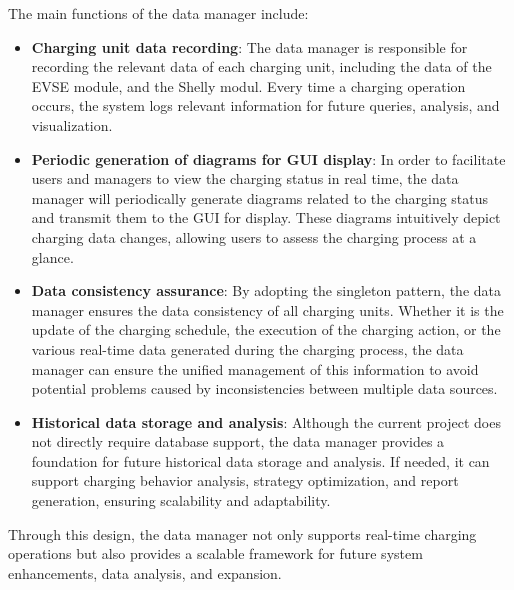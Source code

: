 \documentclass[
english,
ruledheaders=section,%
class=report,%
thesis={type=Report},%
accentcolor=9c,%
custommargins=true,%
marginpar=false,%
parskip=half-,%
fontsize=11pt,%
logofile={img/tuda_logo.pdf}, %
]{tudapub}
\begin{document}
    The main functions of the data manager include:
    \begin{itemize}
        \item \textbf{Charging unit data recording}: The data manager is responsible for recording the relevant data of each charging unit, including the data of the EVSE module, and the Shelly modul. Every time a charging operation occurs, the system logs relevant information for future queries, analysis, and visualization.
        \item \textbf{Periodic generation of diagrams for GUI display}: In order to facilitate users and managers to view the charging status in real time, the data manager will periodically generate diagrams related to the charging status and transmit them to the GUI for display. These diagrams intuitively depict charging data changes, allowing users to assess the charging process at a glance.
        \item \textbf{Data consistency assurance}: By adopting the singleton pattern, the data manager ensures the data consistency of all charging units. Whether it is the update of the charging schedule, the execution of the charging action, or the various real-time data generated during the charging process, the data manager can ensure the unified management of this information to avoid potential problems caused by inconsistencies between multiple data sources.
        \item \textbf{Historical data storage and analysis}: Although the current project does not directly require database support, the data manager provides a foundation for future historical data storage and analysis. If needed, it can support charging behavior analysis, strategy optimization, and report generation, ensuring scalability and adaptability.
    \end{itemize}
    Through this design, the data manager not only supports real-time charging operations but also provides a scalable framework for future system enhancements, data analysis, and expansion.


\end{document}
